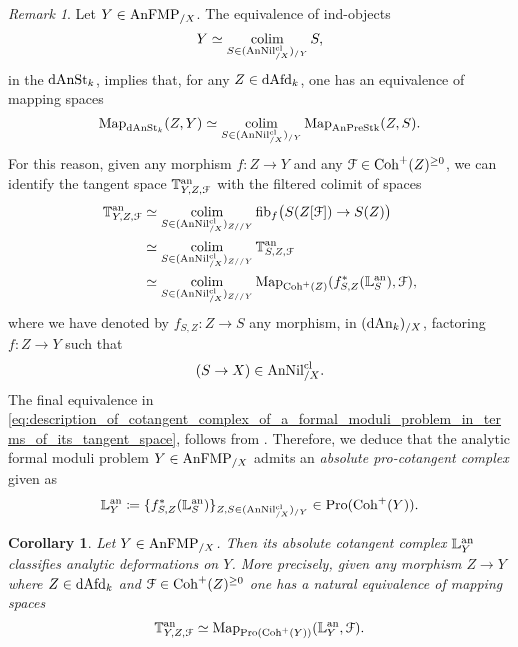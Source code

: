 \documentclass[10pt,a4paper,reqno]{amsart} %
\theoremstyle{plain}
\newtheorem{cor}[thm]{Corollary}
\theoremstyle{definition}
\theoremstyle{remark}
\newtheorem{rem}[thm]{Remark}
\numberwithin{equation}{section}
\begin{document}
\begin{rem} \label{rem:construction_of_analytic_cotangent_complex_of_analytic_FMP_over_X} Let $Y \in \mathrm{AnFMP}_{/X}$.
    The equivalence of ind-objects
        \[
            Y \simeq \operatorname*{colim}_{S \in (\mathrm{AnNil}^{\mathrm{cl}}_{/X})_{/Y}} S,
        \]
    in the \infcat $\mathrm{dAnSt}_k$, implies that, for any $Z \in \mathrm{dAfd}_k$, one has an equivalence of mapping spaces
        \[
            \operatorname{Map}_{\mathrm{dAnSt}_k}(Z, Y) \simeq \operatorname*{colim}_{S \in (\mathrm{AnNil}^{\mathrm{cl}}_{/X})_{/Y}}  \operatorname{Map}_{\mathrm{AnPreStk}}(Z,S ).
        \]
    For this reason, given any morphism $f \colon Z \to Y$ and any
    $\mathcal F \in \mathrm{Coh}^+(Z)^{\ge 0}$, we can identify the tangent space $\mathbb T^\mathrm{an}_{Y, Z, \mathcal F}$
    with the filtered colimit of spaces
        \begin{align} \label{eq:description_of_cotangent_complex_of_a_formal_moduli_problem_in_terms_of_its_tangent_space}
            \mathbb T^\mathrm{an}_{Y, Z, \mathcal F} & \simeq \operatorname*{colim}_{S \in (\mathrm{AnNil}^{\mathrm{cl}}_{/X})_{Z/ /Y}} \mathrm{fib}_f \big( S(Z[\mathcal F]) \to S(Z) \big) \\
                                & \simeq \operatorname*{colim}_{S \in (\mathrm{AnNil}^{\mathrm{cl}}_{/X})_{Z/ /Y}} \mathbb T^\mathrm{an}_{S, Z , \mathcal F } \\
                                & \simeq \operatorname*{colim}_{S \in (\mathrm{AnNil}^{\mathrm{cl}}_{/X})_{Z/ /Y}} \operatorname{Map}_{\mathrm{Coh}^+(Z)} (f_{S,Z}^* (\mathbb L^\mathrm{an}_S), \mathcal F),
        \end{align}
    where we have denoted by $f_{S, Z} \colon Z \to S$ any morphism, in $(\mathrm{dAn}_k)_{/X}$, factoring $f \colon Z \to Y$ such that
        \[(S \to X) \in \mathrm{AnNil}^{\mathrm{cl}}_{/X}.\]
    The final equivalence in \eqref{eq:description_of_cotangent_complex_of_a_formal_moduli_problem_in_terms_of_its_tangent_space}, follows from \cite[Lemma 7.7]{Porta_Yu_Representability}.
    Therefore, we deduce that
    the analytic formal moduli problem
    $Y \in \mathrm{AnFMP}_{/X}$ admits an \emph{absolute pro-cotangent complex} given as
        \[
           \mathbb L^\mathrm{an}_Y \coloneqq \{ f^*_{S,Z}( \mathbb L^\mathrm{an}_S )  \}_{Z, S \in (\mathrm{AnNil}^{\mathrm{cl}}_{/X})_{/Y}} \in \mathrm{Pro}(\mathrm{Coh}^+(Y)).
        \]
\end{rem}   

\begin{cor}
    Let $Y \in \mathrm{AnFMP}_{/X}$. Then its absolute cotangent complex $\mathbb L^\mathrm{an}_Y$ classifies analytic deformations on $Y$. More precisely, given any morphism $Z \to Y$
    where $Z \in \mathrm{dAfd}_k$ and $\mathcal F \in \mathrm{Coh}^+(Z)^{\ge 0}$ one has a natural equivalence of mapping spaces
        \[
            \mathbb T^\mathrm{an}_{Y, Z, \mathcal F} \simeq \operatorname{Map}_{\mathrm{Pro}(\mathrm{Coh}^+(Y))}(\mathbb L^\mathrm{an}_Y, \mathcal F).  
        \]
\end{cor}
\end{document}

